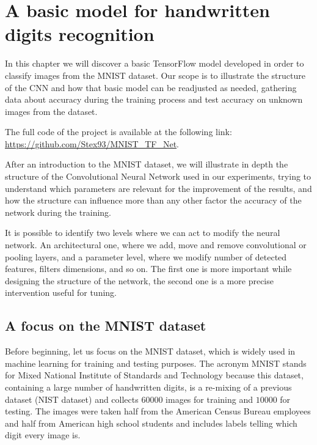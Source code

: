 \chapter{A basic model for handwritten digits recognition}\label{ch:basic_tf_model}

In this chapter we will discover a basic TensorFlow model developed in order to classify images from the \acs{MNIST} dataset. Our scope is to illustrate the structure of the \acs{CNN} and how that basic model can be readjusted as needed, gathering data about accuracy during the training process and test accuracy on unknown images from the dataset.

The full code of the project is available at the following link:\\
\href{https://github.com/Stex93/MNIST_TF_Net}{https://github.com/Stex93/MNIST\_TF\_Net}.

After an introduction to the \acs{MNIST} dataset, we will illustrate in depth the structure of the Convolutional Neural Network used in our experiments, trying to understand which parameters are relevant for the improvement of the results, and how the structure can influence more than any other factor the accuracy of the network during the training.

It is possible to identify two levels where we can act to modify the neural network. An architectural one, where we add, move and remove convolutional or pooling layers, and a parameter level, where we modify number of detected features, filters dimensions, and so on. The first one is more important while designing the structure of the network, the second one is a more precise intervention useful for tuning.

\section{A focus on the MNIST dataset}

Before beginning, let us focus on the \acs{MNIST} dataset, which is widely used in machine learning for training and testing purposes. The acronym \acs{MNIST} stands for Mixed National Institute of Standards and Technology because this dataset, containing a large number of handwritten digits, is a re-mixing of a previous dataset (NIST dataset) and collects $60000$ images for training and $10000$ for testing. The images were taken half from the American Census Bureau employees and half from American high school students and includes labels telling which digit every image is.

